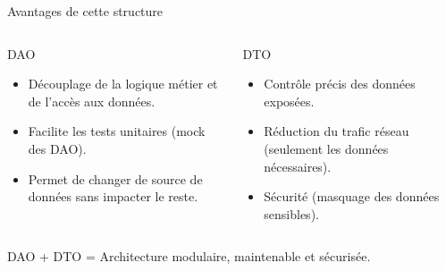 \documentclass[aspectratio=169,10pt]{beamer}
\begin{document}
\begin{frame}{Avantages de cette structure}
    \begin{columns}
        \begin{block}{DAO}
            \begin{itemize}
                \item Découplage de la logique métier et de l'accès aux données.
                \item Facilite les tests unitaires (mock des DAO).
                \item Permet de changer de source de données sans impacter le reste.
            \end{itemize}
        \end{block}
        \begin{block}{DTO}
            \begin{itemize}
                \item Contrôle précis des données exposées.
                \item Réduction du trafic réseau (seulement les données nécessaires).
                \item Sécurité (masquage des données sensibles).
            \end{itemize}
        \end{block}
    \end{columns}
    \begin{center}
        \small{DAO + DTO = Architecture modulaire, maintenable et sécurisée.}
    \end{center}
\end{frame}
\end{document}
